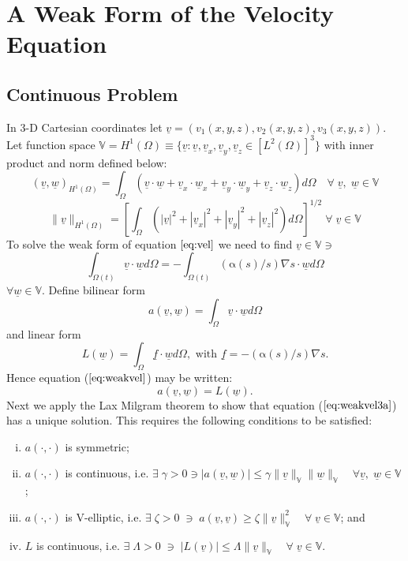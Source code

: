 \documentclass[11pt]{article}
\newcommand{\ul}{\underline}
\newcommand{\bigv}{\mathbb{V}}
\newcommand{\Om}{\Omega}
\newcommand{\al}{\mathrm{\alpha}}
\begin{document}
\section{A Weak Form of the Velocity Equation}
\subsection{Continuous Problem}
In 3-D Cartesian coordinates let $\ul{v} = (v_1(x,y,z),v_2(x,y,z),v_3(x,y,z))$. Let function space $ \bigv = H^1(\Om)\equiv\{\ul{v}: \ul{v}, \ul{v}_x, \ul{v}_y, \ul{v}_z  \in [{L}^2(\Omega)]^3\}$ with inner product and norm defined below:
$$(\ul{v},\ul{w})_{H^{1}(\Om)} = \int_{\Om}(\ul{v}\cdot\ul{w}+ \ul{v}_x\cdot\ul{w}_x + \ul{v}_y\cdot\ul{w}_y + \ul{v}_z\cdot\ul{w}_z  )d\Om\quad \forall \;\ul{v},\; \ul{w} \in\bigv$$
$$ \|\ul{v}\|_{H^1(\Om)} =\left[ \int_{\Om} (|\ul{v}|^2 + |\ul{v}_x|^2 +|\ul{v}_y|^2 + |\ul{v}_z|^2)d\Om\right]^{1/2}\; \forall \;\ul{v}\in\bigv$$
To solve the weak form of equation $\ref{eq:vel}$ we need to find $\ul{v} \in \bigv \ni$
\begin{equation}
\label{eq:weakvel}
\int_{\Omega(t)} \ul{v}\cdot\ul{w}d{\Omega} =  -\int_{\Omega(t)}(\al(s)/s)\nabla{s}\cdot\ul{w}d{\Omega}
\end{equation}
$\forall \ul{w} \in \bigv$.
Define bilinear form $$a(\ul{v},\ul{w}) = \int_{\Om}\ul{v}\cdot\ul{w}d{\Om}$$ and linear form $$L(\ul{w}) =  \int_{\Om}\ul{f}\cdot\ul{w}d\Om, \text{ with } \ul{f} = -(\al(s)/s)\nabla{s}.$$
Hence equation ($\ref{eq:weakvel}$) may be written:
\begin{equation}
\label{eq:weakvel3a}
a(\ul{v},\ul{w}) = L(\ul{w}).
\end{equation}
Next we apply the Lax Milgram theorem to show that equation ($\ref{eq:weakvel3a}$) has a unique solution. This requires the following conditions to be satisfied:
\begin{enumerate}[(i)]
\item $a(\cdot,\cdot)$ is symmetric;
\item $a(\cdot,\cdot)$ is continuous, i.e. $\exists\; \gamma >0 \ni |a(\ul{v},\ul{w})| \leq \gamma\|\ul{v}\|_{\bigv}\|\ul{w}\|_{\bigv} \quad \forall \ul{v},\;\ul{w} \in \bigv$;
\item $a(\cdot,\cdot)$ is V-elliptic, i.e. $\exists\; \zeta > 0 \; \ni \; a(\ul{v},\ul{v}) \geq \zeta\|  \ul{v}   \|_{\bigv}^2\quad \forall \; \ul{v}\in\bigv$; and 
\item $L$ is continuous, i.e. $ \exists\; \Lambda > 0 \; \ni \; |L(\ul{v})| \leq \Lambda\|\ul{v}   \|_{\bigv}\quad \forall\;\ul{v} \in \bigv.$
\end{enumerate}
\end{document}
